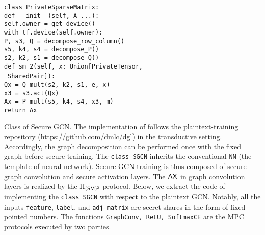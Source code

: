 \vspace{2mm}
\noindent
\begin{frame}{\texttt{class PrivateSparseMatrix:}}
\\\indent\texttt{def \_\_init\_\_(self, A ...):}
\\\indent\indent\texttt{self.owner = get\_device()}
\\\indent\indent\texttt{with tf.device(self.owner):}
\\\indent\indent\indent\texttt{P, s3, Q = decompose\_row\_column()}
\\\indent\indent\indent\texttt{s5, k4, s4 = decompose\_P()}
\\\indent\indent\indent\texttt{s2, k2, s1 = decompose\_Q()}
\\\indent\texttt{def sm\_2(self, x: Union[PrivateTensor,} \\\indent\indent\indent\indent\ \indent\indent\indent\indent\texttt{SharedPair]):}
\\\indent\indent\texttt{Qx = Q\_mult(s2, k2, s1, e, x)}
\\\indent\indent\texttt{x3 = s3.act(Qx)}
\\\indent\indent\texttt{Ax = P\_mult(s5, k4, s4, x3, m)}
\\\indent\indent\texttt{return Ax}

\end{frame}

{Class of Secure GCN.}
The implementation of \cgnn follows the plaintext-training repository (\url{https://github.com/dmlc/dgl}) in the transductive setting.
Accordingly, the graph decomposition can be performed once with the fixed graph before secure training.
The \texttt{class SGCN} inherits the conventional \texttt{NN} (the template of neural network).
Secure GCN training is thus composed of secure graph convolution and secure activation layers.
The $\mathsf{A}\mathsf{X}$ in graph convolution layers is realized by the $\Pi_{\mathsf{(SM)^2}}$ protocol.
Below, we extract the code of implementing the \texttt{class SGCN} with respect to the plaintext GCN.
Notably, all the inputs \texttt{feature}, \texttt{label}, and \texttt{adj\_matrix} are secret shares in the form of fixed-pointed numbers.
The functions \texttt{GraphConv, ReLU, SoftmaxCE} are the MPC protocols executed by two parties.


